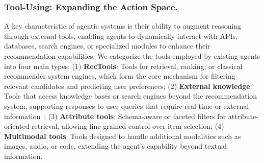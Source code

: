 {
\subsubsection{\textbf{Tool-Using: Expanding the Action Space.}}\label{subsubsec:agent_rec_tools}
A key characteristic of agentic systems is their ability to augment reasoning through external tools, enabling agents to dynamically interact with APIs, databases, search engines, or specialized modules to enhance their recommendation capabilities. We categorize the tools employed by existing agents into four main types:
(1) \textbf{RecTools}: Tools for retrieval, ranking, or classical recommender system engines, which form the core mechanism for filtering relevant candidates and predicting user preferences;
(2) \textbf{External knowledge}: Tools that access knowledge bases or search engines beyond the recommendation system, supporting responses to user queries that require real-time or external information~\cite{guo2024knowledge};
(3)
\textbf{Attribute tools}: Schema-aware or faceted filters for attribute-oriented retrieval, allowing fine-grained control over item selection;
(4)
\textbf{Multimodal tools}: Tools designed to handle additional modalities such as images, audio, or code, extending the agent’s capability beyond textual information.}

